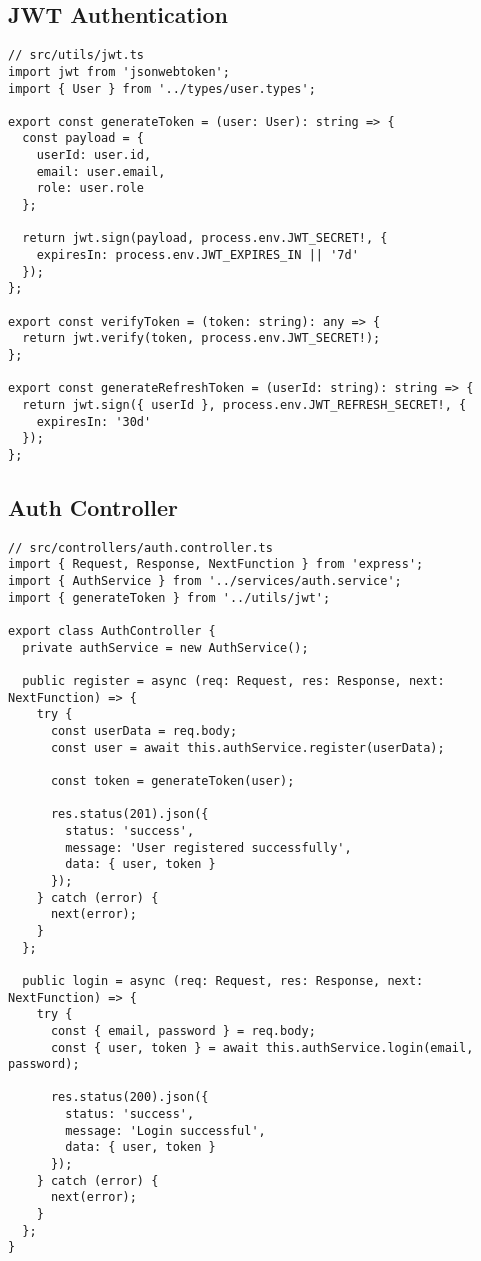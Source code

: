 \documentclass[12pt,a4paper]{article}
\begin{document}
\subsection{JWT Authentication}
\begin{lstlisting}[caption=JWT Utility Functions]
// src/utils/jwt.ts
import jwt from 'jsonwebtoken';
import { User } from '../types/user.types';

export const generateToken = (user: User): string => {
  const payload = {
    userId: user.id,
    email: user.email,
    role: user.role
  };
  
  return jwt.sign(payload, process.env.JWT_SECRET!, {
    expiresIn: process.env.JWT_EXPIRES_IN || '7d'
  });
};

export const verifyToken = (token: string): any => {
  return jwt.verify(token, process.env.JWT_SECRET!);
};

export const generateRefreshToken = (userId: string): string => {
  return jwt.sign({ userId }, process.env.JWT_REFRESH_SECRET!, {
    expiresIn: '30d'
  });
};
\end{lstlisting}

\subsection{Auth Controller}
\begin{lstlisting}[caption=Authentication Controller]
// src/controllers/auth.controller.ts
import { Request, Response, NextFunction } from 'express';
import { AuthService } from '../services/auth.service';
import { generateToken } from '../utils/jwt';

export class AuthController {
  private authService = new AuthService();

  public register = async (req: Request, res: Response, next: NextFunction) => {
    try {
      const userData = req.body;
      const user = await this.authService.register(userData);
      
      const token = generateToken(user);
      
      res.status(201).json({
        status: 'success',
        message: 'User registered successfully',
        data: { user, token }
      });
    } catch (error) {
      next(error);
    }
  };

  public login = async (req: Request, res: Response, next: NextFunction) => {
    try {
      const { email, password } = req.body;
      const { user, token } = await this.authService.login(email, password);
      
      res.status(200).json({
        status: 'success',
        message: 'Login successful',
        data: { user, token }
      });
    } catch (error) {
      next(error);
    }
  };
}
\end{lstlisting}
\end{document}
